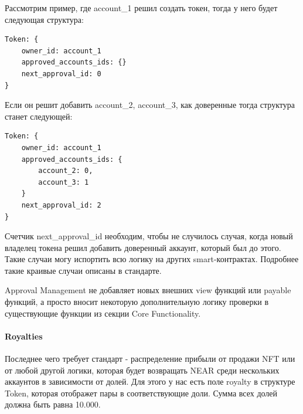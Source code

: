 Рассмотрим пример, где account\_1 решил создать токен, тогда у него будет следующая структура:
\begin{verbatim}
Token: {
    owner_id: account_1
    approved_accounts_ids: {}
    next_approval_id: 0
}
\end{verbatim}

Если он решит добавить account\_2, account\_3, как доверенные тогда структура станет следующей:
\begin{verbatim}
Token: {
    owner_id: account_1
    approved_accounts_ids: {
        account_2: 0,
        account_3: 1
    }
    next_approval_id: 2
}
\end{verbatim}

Счетчик next\_approval\_id  необходим, чтобы не случилось случая, когда новый владелец токена решил добавить доверенный аккаунт, который был до этого. Такие случаи могу испортить всю логику на других smart-контрактах.
Подробнее такие краивые случаи описаны в стандарте\cite{approvalstandard}.

Approval Management не добавляет новых внешних view функций или payable функций, а просто вносит некоторую дополнительную логику проверки в существующие функции из секции Core Functionality.

\paragraph{Royalties}

Последнее чего требует стандарт - распределение прибыли от продажи NFT или от любой другой логики, которая будет возвращать NEAR среди нескольких аккаунтов в зависимости от долей\cite{royaltystandard}.
Для этого у нас есть поле royalty в структуре Token, которая отображет пары в соответствующие доли. Сумма всех долей должна быть равна 10.000.

